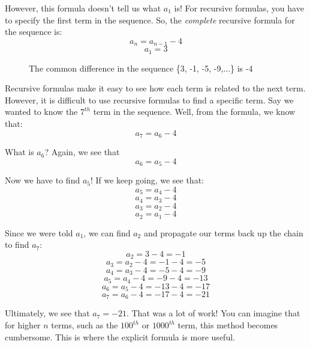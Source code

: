 However, this formula doesn't tell us what $a_1$ is! For recursive 
formulas, you have to specify the first term in the sequence. So, the 
\textit{complete} recursive formula for the sequence is:
$$a_n = a_{n-1}-4$$
$$a_1 = 3$$

\begin{figure}[htbp]
\centering
    \caption{The common difference in the sequence \{3, -1, -5, -9,...\} is -4}
    \label{fig:comdiff}
\end{figure}

Recursive formulas make it easy to see how each term is related to 
the next term. However, it is difficult to use recursive formulas to 
find a specific term. Say we wanted to know the $7^{th}$ term in the 
sequence. Well, from the formula, we know that:
$$a_7 = a_6 - 4$$

What is $a_6$? Again, we see that
$$a_6 = a_5 - 4$$

Now we have to find $a_5$! If we keep going, we see that:
$$a_5 = a_4 - 4$$
$$a_4 = a_3 - 4$$
$$a_3 = a_2 - 4$$
$$a_2 = a_1 - 4$$

Since we were told $a_1$, we can find $a_2$ and propagate our terms 
back up the chain to find $a_7$:
$$a_2 = 3 - 4 = -1$$
$$a_3 = a_2 - 4 = -1 - 4 = -5$$
$$a_4 = a_3 - 4 = -5 - 4 = -9$$
$$a_5 = a_4 - 4 = -9 - 4 = -13$$
$$a_6 = a_5 - 4 = -13 - 4 = -17$$
$$a_7 = a_6 - 4 = -17 - 4 = -21$$

Ultimately, we see that $a_7 = -21$. That was a lot of work! You can 
imagine that for higher $n$ terms, such as the $100^{th}$ or 
$1000^{th}$ term, this method becomes cumbersome. This is where the 
explicit formula is more useful.

